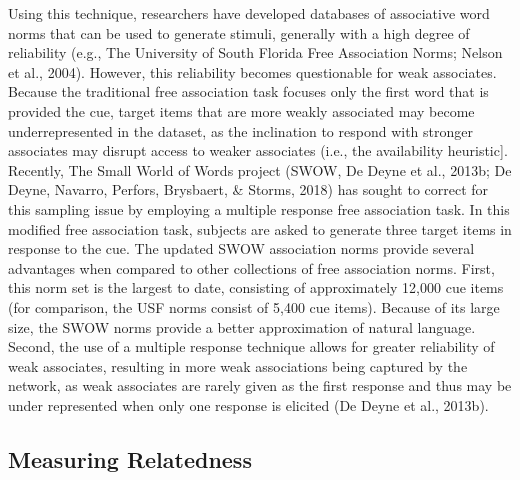 \documentclass[english,,man]{apa6}
\begin{document}
Using this technique, researchers have developed databases of associative word norms that can be used to generate stimuli, generally with a high degree of reliability (e.g., The University of South Florida Free Association Norms; Nelson et al., 2004). However, this reliability becomes questionable for weak associates. Because the traditional free association task focuses only the first word that is provided the cue, target items that are more weakly associated may become underrepresented in the dataset, as the inclination to respond with stronger associates may disrupt access to weaker associates (i.e., the availability heuristic{]}. Recently, The Small World of Words project (SWOW, De Deyne et al., 2013b; De Deyne, Navarro, Perfors, Brysbaert, \& Storms, 2018) has sought to correct for this sampling issue by employing a multiple response free association task. In this modified free association task, subjects are asked to generate three target items in response to the cue. The updated SWOW association norms provide several advantages when compared to other collections of free association norms. First, this norm set is the largest to date, consisting of approximately 12,000 cue items (for comparison, the USF norms consist of 5,400 cue items). Because of its large size, the SWOW norms provide a better approximation of natural language. Second, the use of a multiple response technique allows for greater reliability of weak associates, resulting in more weak associations being captured by the network, as weak associates are rarely given as the first response and thus may be under represented when only one response is elicited (De Deyne et al., 2013b).

\hypertarget{measuring-relatedness}{%
\subsection{Measuring Relatedness}\label{measuring-relatedness}}
\end{document}
